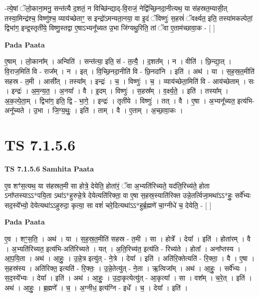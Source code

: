 \documentclass[17pt]{extarticle}
\begin{document}
-त्ये॒षां ॅलो॒काना॒मनु॒ सन्त॑त्यै द॒शतं॒ न विच्छि॑न्द्याद्-वि॒राजं॒ नेद्वि॑च्छि॒नदा॒नीत्यथ॒ या स॑हस्रत॒म्यासी॒त् तस्या॒मिन्द्र॑श्च॒ विष्णु॑श्च॒ व्याय॑च्छेताꣳ॒॒ स इन्द्रो॑ऽमन्यता॒नया॒ वा इ॒दं ॅविष्णुः॑ स॒हस्रं॑ ॅवर्क्ष्यत॒ इति॒ तस्या॑मकल्पेतां॒ द्विभा॑ग॒ इन्द्र॒स्तृती॑ये॒ विष्णु॒स्तद्वा ए॒षाऽभ्यनू᳚च्यत उ॒भा जि॑ग्यथु॒रिति॒ तां ॅवा ए॒ताम॑च्छावा॒क - [  ] \newline

\textbf{Pada Paata} \newline

ए॒षाम् । लो॒काना᳚म् । अन्विति॑ । सन्त॑त्या॒ इति॒ सं - त॒त्यै॒ । द॒शत᳚म् । न । वीति॑ । छि॒न्द्या॒त् । वि॒राज॒मिति॑ वि - राज᳚म् । न । इत् । वि॒च्छि॒नदा॒नीति॑ वि - छि॒नदा॑नि । इति॑ । अथ॑ । या । स॒ह॒स्र॒त॒मीति॑ सहस्र - त॒मी । आसी᳚त् । तस्या᳚म् । इन्द्रः॑ । च॒ । विष्णुः॑ । च॒ । व्याय॑च्छेता॒मिति॑ वि - आय॑च्छेताम् । सः । इन्द्रः॑ । अ॒म॒न्य॒त॒ । अ॒नया᳚ । वै । इ॒दम् । विष्णुः॑ । स॒हस्र᳚म् । व॒र्क्ष्य॒ते॒ । इति॑ । तस्या᳚म् । अ॒क॒ल्पे॒ता॒म् । द्विभा॑ग॒ इति॒ द्वि - भा॒गे॒ । इन्द्रः॑ । तृती॑ये । विष्णुः॑ । तत् । वै । ए॒षा । अ॒भ्यनू᳚च्यत॒ इत्य॑भि-अनू᳚च्यते । उ॒भा । जि॒ग्य॒थुः॒ । इति॑ । ताम् । वै । ए॒ताम् । अ॒च्छा॒वा॒कः ।  \newline





\section{ TS 7.1.5.6 }

\textbf{TS 7.1.5.6 } \newline
\textbf{Samhita Paata} \newline

ए॒व शꣳ॑स॒त्यथ॒ या स॑हस्रत॒मी सा होत्रे॒ देयेति॒ होता॑रं॒ ॅवा अ॒भ्यति॑रिच्यते॒ यद॑ति॒रिच्य॑ते॒ होता ऽना᳚प्तस्याऽऽ*पयि॒ता ऽथा॑ऽ*हुरुन्ने॒त्रे देयेत्यति॑रिक्ता॒ वा ए॒षा स॒हस्र॒स्याति॑रिक्त उन्ने॒तर्त्विजा॒मथा॑ऽऽ*हुः॒ सर्वे᳚भ्यः सद॒स्ये᳚भ्यो॒ देयेत्यथा॑ऽऽहुरुदा॒ कृत्या॒ सा वशं॑ चरे॒दित्यथा॑ऽऽ*हुर्ब्र॒ह्मणे॑ चा॒ग्नीधे॑ च॒ देयेति॒ - [  ] \newline

\textbf{Pada Paata} \newline

ए॒व । शꣳ॒॒स॒ति॒ । अथ॑ । या । स॒ह॒स्र॒त॒मीति॑ सहस्र - त॒मी । सा । होत्रे᳚ । देया᳚ । इति॑ । होता॑रम् । वै । अ॒भ्यति॑रिच्यत॒ इत्य॑भि-अति॑रिच्यते । यत् । अ॒ति॒रिच्य॑त॒ इत्य॑ति - रिच्य॑ते । होता᳚ । अना᳚प्तस्य । आ॒प॒यि॒ता । अथ॑ । आ॒हुः॒ । उ॒न्ने॒त्र इत्यु॑त् - ने॒त्रे । देया᳚ । इति॑ । अति॑रि॒क्तेत्यति॑ - रि॒क्ता॒ । वै । ए॒षा । स॒हस्र॑स्य । अति॑रिक्त॒ इत्यति॑ - रि॒क्तः॒ । उ॒न्ने॒तेत्यु॑त् - ने॒ता । ऋ॒त्विजा᳚म् । अथ॑ । आ॒हुः॒ । सर्वे᳚भ्यः । स॒द॒स्ये᳚भ्यः । देया᳚ । इति॑ । अथ॑ । आ॒हुः॒ । उ॒दा॒कृत्येत्यु॑त् - आ॒कृत्या᳚ । सा । वश᳚म् । च॒रे॒त् । इति॑ । अथ॑ । आ॒हुः॒ । ब्र॒ह्मणे᳚ । च॒ । अ॒ग्नीध॒ इत्य॑ग्नि - इधे᳚ । च॒ । देया᳚ । इति॑ ।  \newline
\end{document}
